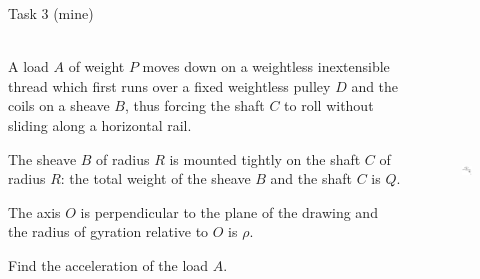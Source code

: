\documentclass[aspectratio=169]{beamer}
\begin{document}
\begin{frame}[t]{Task 3 (mine)}
\framesubtitle{}
\small
\begin{columns}[T,onlytextwidth]
    \begin{column}{0.59\textwidth}
        A load $A$ of weight $P$ moves down on a weightless inextensible thread which first runs over a fixed weightless pulley $D$ and the coils on a sheave $B$, thus forcing the shaft $C$ to roll without sliding along a horizontal rail.
        \medskip

        The sheave $B$ of radius $R$ is mounted tightly on the shaft $C$ of radius $R$: the total weight of the sheave $B$ and the shaft $C$ is $Q$.
        \medskip

        The axis $O$ is perpendicular to the plane of the drawing and the radius of gyration relative to $O$ is $\rho$.

        \bigskip
        Find the acceleration of the load $A$.

    \end{column}
    \begin{column}{0.39\textwidth}
            \begin{figure}[H]
        \centering\includegraphics[height=6cm,width=1\textwidth,keepaspectratio]{image11.png}
        \label{fig:image11.png}
    \end{figure}
    \end{column}
\end{columns}
\end{frame}
\end{document}
